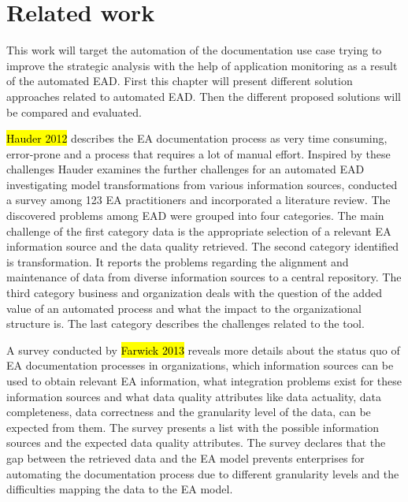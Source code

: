 \chapter{Related work}\label{chapter:relatedwork}

This work will target the automation of the documentation use case trying to improve the strategic analysis with the help of application monitoring as a result of the automated EAD. First this chapter will present different solution approaches related to automated EAD. Then the different proposed solutions will be compared and evaluated. 

\hl{Hauder 2012} describes the EA documentation process as very time consuming, error-prone and a process that requires a lot of manual effort. Inspired by these challenges Hauder examines the further challenges for an automated EAD investigating model transformations from various information sources, conducted a survey among 123 EA practitioners and incorporated a literature review. The discovered problems among EAD were grouped into four categories. The main challenge of the first category data is the appropriate selection of a relevant EA information source and the data quality retrieved. The second category identified is transformation. It reports the problems regarding the alignment and maintenance of data from diverse information sources to a central repository. The third category business and organization deals with the question of the added value of an automated process and what the impact to the organizational structure is. The last category describes the challenges related to the tool. 

A survey conducted by \hl{Farwick 2013} reveals more details about the  status quo of EA documentation processes in organizations, which information sources can be used to obtain relevant EA information, what integration problems exist for these information sources and what data quality attributes like data actuality,  data completeness, data correctness and the granularity level of the data, can be expected from them. The survey presents a list with the possible information sources and the expected data quality attributes. The survey declares that the gap between the retrieved data and the EA model prevents enterprises for automating the documentation process due to different granularity levels and the difficulties mapping the data to the EA model.

